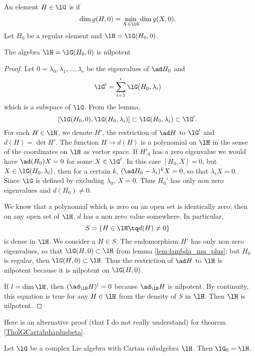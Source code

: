 An element $H\in\lG$ is  if 
\[
\dim g(H,0)=\min_{X\in\lG}\dim g(X,0).
\]
Let $H_0$ be a regular element and $\lH=\lG(H_0,0)$.

\begin{lemma}
    The algebra $\lH=\lG(H_0,0)$ is nilpotent
\end{lemma}

\begin{proof}
Let $0=\lambda_0,\lambda_1,\ldots,\lambda_r$ be the eigenvalues of $\ad H_0$ and
\[
\lG'=\sum_{i=1}^{r} \lG(H_0,\lambda_i)
\]
which is a subspace of $\lG$. From the lemma,
\[
[\lG(H_0,0),\lG(H_0,\lambda_i)]\subset\lG(H_0,\lambda_i)\subset\lG'.
\]
For each $H\in\lH$, we denote $H'$, the restriction of $\ad H$ to $\lG'$ and $d(H)=\det H'$. The function $H\to d(H)$ is a polynomial on $\lH$ in the sense of the coordinates on $\lH$ as vector space. If $H'_0$ has a zero eigenvalue we would have $\ad(H_0)X=0$ for some $X\in\lG'$. In this case $[H_0,X]=0$, but $X\in\lG(H_0,\lambda_i)$, then for a certain $k$, $(\ad H_0-\lambda_i)^kX=0$, so that $\lambda_iX=0$. Since $\lG$ is defined by excluding $\lambda_0$, $X=0$. Thus $H_0'$ has only non zero eigenvalues and $d(H_0)\neq 0$.

We know that a polynomial which is zero on an open set is identically zero; then on any open set of $\lH$, $d$ has a non zero value somewhere. In particular,
\[
S=\{H\in\lH\tq d(H)\neq 0\}
\]
is dense in $\lH$. We consider a $H\in S$. The endomorphism $H'$ has only non zero eigenvalues, so that $\lG(H,0)\subset\lH$ from lemma \ref{lem:lambda_mu_plus}; but $H_0$ is regular, then $\lG(H,0)\subset\lH$. Thus the restriction of $\ad H$ to $\lH$ is nilpotent because it is nilpotent on $\lG(H,0)$.

If $l=\dim\lH$, then $(\ad_{\lH}H)^l=0$ because $\ad_{\lH}H$ is nilpotent. By continuity, this equation is true for any $H\in\lH$ from the density of $S$ in $\lH$. Then $\lH$ is nilpotent.

\end{proof}


Here is an alternative proof (that I do not really understand) for theorem \ref{TholGCartalphaplusbeta}.
\begin{theorem}    
Let $\lG$ be a complex Lie algebra with Cartan subalgebra $\lH$. Then $\lG_0=\lH$.
\end{theorem}    

